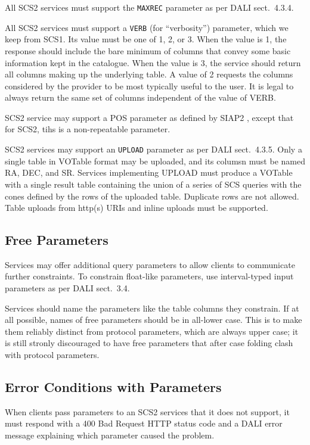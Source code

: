 \documentclass[11pt,a4paper]{ivoa}
\begin{document}
All SCS2 services must support the \verb|MAXREC| parameter as per DALI
sect.~4.3.4.

All SCS2 services must support a \verb|VERB| (for ``verbosity'')
parameter, which we keep from SCS1.  Its value must be one of 1, 2, or
3.  When the value is 1, the response should include the bare minimum of
columns that convey some basic information kept in the catalogue.  When
the value is 3, the service should return all columns making up the
underlying table.  A value of 2 requests the columns considered by the
provider to be most typically useful to the user.   It is legal to
always return the same set of columns independent of the value of VERB.

SCS2 service may support a POS parameter as defined by SIAP2
\citep{2015ivoa.spec.1223D}, except that for SCS2, tihs is a
non-repeatable parameter.

SCS2 services may support an \texttt{UPLOAD} parameter as per DALI
sect.~4.3.5.  Only a single table in VOTable format may be uploaded, and
its columsn must be named RA, DEC, and SR.  Services implementing UPLOAD
must produce a VOTable with a single result table containing the union
of a series of SCS queries with the cones defined by the rows of the
uploaded table.  Duplicate rows are not allowed.  Table uploads from
http(s) URIs and inline uploads must be supported.

\subsection{Free Parameters}

Services may offer additional query parameters to allow clients to
communicate further constraints.  To constrain float-like parameters,
use interval-typed input parameters as per DALI sect.~3.4.

Services should name the parameters like the table columns they
constrain.  If at all possible, names of free parameters should be in
all-lower case.  This is to make them reliably distinct from protocol
parameters, which are always upper case; it is still stronly discouraged
to have free parameters that after case folding clash with protocol
parameters.

\subsection{Error Conditions with Parameters}

When clients pass parameters to an SCS2 services that it does not support,
it must respond with a 400 Bad Request HTTP status code and a DALI error
message explaining which parameter caused the problem.
\end{document}
